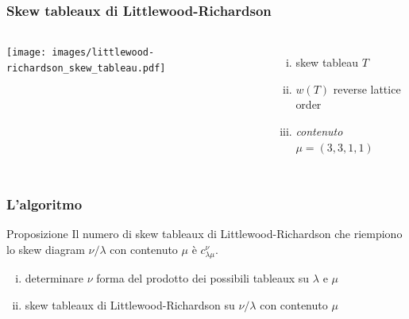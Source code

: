 \documentclass{beamer}
\begin{document}
\begin{frame}
\frametitle{Skew tableaux di Littlewood-Richardson}
\begin{columns}[T]
\column{5cm}
\texttt{[image: images/littlewood-richardson\_skew\_tableau.pdf]}
\column{5cm}
\begin{enumerate}[(i)]
\item skew tableau $T$
\item $w(T)$ reverse lattice order
\item \emph{contenuto} $\mu=(3,3,1,1)$
\end{enumerate}
\end{columns}
\end{frame}

\begin{frame}
\frametitle{L'algoritmo}
\begin{block}{Proposizione}
Il numero di skew tableaux di Littlewood-Richardson che riempiono lo
skew diagram $\nu/\lambda$ con contenuto $\mu$ \`e $c_{\lambda \mu}^{\nu}$.
\end{block}
\begin{enumerate}[(i)]
\item determinare $\nu$ forma del prodotto dei possibili tableaux su
  $\lambda$ e $\mu$
\item skew tableaux di Littlewood-Richardson su $\nu / \lambda$ con
  contenuto $\mu$
\end{enumerate}
\end{frame}
\end{document}
